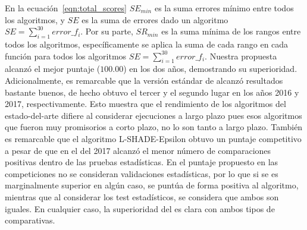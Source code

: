 En la ecuación~\ref{eqn:total_scores} $SE_{min}$ es la suma errores mínimo entre todos los algoritmos, y $SE$ es la suma de errores dado un algoritmo $SE = \sum_{i=1}^{30} error\_f_i$.
%
Por su parte, $SR_{min}$ es la suma mínima de los rangos entre todos los algoritmos, específicamente se aplica la suma de cada rango en cada función para todos 
los algoritmos $SE = \sum_{i=1}^{30} error\_f_i$.
%
Nuestra propuesta alcanzó el mejor puntaje ($100.00$) en los dos años, demostrando su superioridad. 
%
Adicionalmente, es remarcable que la versión estándar de \DE{} alcanzó resultados bastante buenos, de hecho obtuvo el tercer y el segundo lugar en los años 2016 y 2017, respectivamente.
%
Esto muestra que el rendimiento de los algoritmos del estado-del-arte difiere al considerar ejecuciones a largo plazo pues esos algoritmos que fueron muy promisorios a corto plazo,
no lo son tanto a largo plazo.
%
También es remarcable que el algoritmo L-SHADE-Epsilon obtuvo un puntaje competitivo a pesar de que en el \CEC{} del 2017 
alcanzó el menor número de comparaciones positivas dentro de las pruebas estadísticas.
%
En el puntaje propuesto en las competiciones no se consideran validaciones estadísticas, por lo que si se es marginalmente superior en algún caso, se puntúa
de forma positiva al algoritmo, mientras que al considerar los test estadísticos, se considera que ambos son iguales.
%
En cualquier caso, la superioridad del \DEEDM{} es clara con ambos tipos de comparativas.

%
%
%
%
%
%

